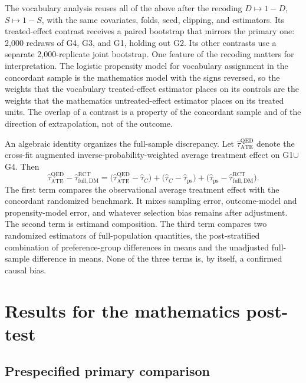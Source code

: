 \documentclass[twoside,11pt]{article}
\begin{document}
The vocabulary analysis reuses all of the above after the recoding $D\mapsto 1-D$, $S\mapsto 1-S$, with the same covariates, folds, seed, clipping, and estimators. Its treated-effect contrast receives a paired bootstrap that mirrors the primary one: 2{,}000 redraws of G4, G3, and G1, holding out G2. Its other contrasts use a separate 2{,}000-replicate joint bootstrap. One feature of the recoding matters for interpretation. The logistic propensity model for vocabulary assignment in the concordant sample is the mathematics model with the signs reversed, so the weights that the vocabulary treated-effect estimator places on its controls are the weights that the mathematics untreated-effect estimator places on its treated units. The overlap of a contrast is a property of the concordant sample and of the direction of extrapolation, not of the outcome.

An algebraic identity organizes the full-sample discrepancy. Let $\widehat\tau^{\mathrm{QED}}_{\mathrm{ATE}}$ denote the cross-fit augmented inverse-probability-weighted average treatment effect on G1$\cup$G4. Then
\begin{equation}
\widehat\tau^{\mathrm{QED}}_{\mathrm{ATE}}
-
\widehat\tau^{\mathrm{RCT}}_{\mathrm{full,DM}}
=
\bigl(\widehat\tau^{\mathrm{QED}}_{\mathrm{ATE}}-\widehat\tau_C\bigr)
+
\bigl(\widehat\tau_C-\widehat\tau_{\mathrm{ps}}\bigr)
+
\bigl(\widehat\tau_{\mathrm{ps}}
-
\widehat\tau^{\mathrm{RCT}}_{\mathrm{full,DM}}\bigr).
\label{eq:decomposition}
\end{equation}
The first term compares the observational average treatment effect with the concordant randomized benchmark. It mixes sampling error, outcome-model and propensity-model error, and whatever selection bias remains after adjustment. The second term is estimand composition. The third term compares two randomized estimators of full-population quantities, the post-stratified combination of preference-group differences in means and the unadjusted full-sample difference in means. None of the three terms is, by itself, a confirmed causal bias.

\section{Results for the mathematics post-test}
\label{sec:results}

\subsection{Prespecified primary comparison}
\end{document}
